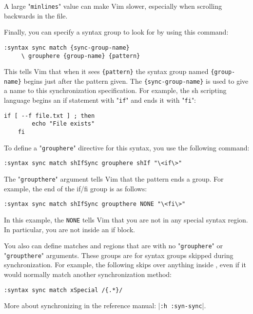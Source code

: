 A large "\verb!minlines!" value can make Vim slower, especially when scrolling backwards in the file.

Finally, you can specify a syntax group to look for by using this command:

\begin{Verbatim}[samepage=true]
 :syntax sync match {sync-group-name}
     \ grouphere {group-name} {pattern}
\end{Verbatim}

This tells Vim that when it sees \verb!{pattern}! the syntax group named \verb!{group-name}! begins just after the pattern given.
The \verb!{sync-group-name}! is used to give a name to this synchronization specification.
For example, the sh scripting language begins an if statement with "\verb!if!" and ends it with "\verb!fi!":

\begin{Verbatim}[samepage=true]
    if [ --f file.txt ] ; then 
        echo "File exists" 
    fi 
\end{Verbatim}

To define a "\verb!grouphere!" directive for this syntax, you use the following command:

\begin{Verbatim}[samepage=true]
 :syntax sync match shIfSync grouphere shIf "\<if\>"
\end{Verbatim}

The "\verb!groupthere!" argument tells Vim that the pattern ends a group.
For example, the end of the if/fi group is as follows:

\begin{Verbatim}[samepage=true]
 :syntax sync match shIfSync groupthere NONE "\<fi\>"
\end{Verbatim}

In this example, the \verb!NONE! tells Vim that you are not in any special syntax region.
In particular, you are not inside an if block.

You also can define matches and regions that are with no "\verb!grouphere!" or "\verb!groupthere!" arguments.
These groups are for syntax groups skipped during synchronization.
For example, the following skips over anything inside {}, even if it would normally match another synchronization method:

\begin{Verbatim}[samepage=true]
 :syntax sync match xSpecial /{.*}/
\end{Verbatim}

More about synchronizing in the reference manual: |\verb!:h :syn-sync!|.
